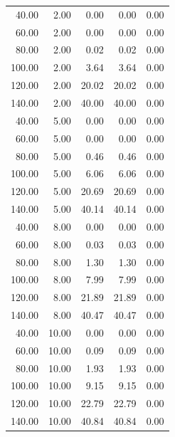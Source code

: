 \begin{longtable}{@{}rrrrr@{}}
40.00  & 2.00  & 0.00 & 0.00 & 0.00 \\
60.00  & 2.00  & 0.00 & 0.00 & 0.00 \\
80.00  & 2.00  & 0.02 & 0.02 & 0.00 \\
100.00 & 2.00  & 3.64 & 3.64 & 0.00 \\
120.00 & 2.00  & 20.02 & 20.02 & 0.00 \\
140.00 & 2.00  & 40.00 & 40.00 & 0.00 \\
40.00  & 5.00  & 0.00 & 0.00 & 0.00 \\
60.00  & 5.00  & 0.00 & 0.00 & 0.00 \\
80.00  & 5.00  & 0.46 & 0.46 & 0.00 \\
100.00 & 5.00  & 6.06 & 6.06 & 0.00 \\
120.00 & 5.00  & 20.69 & 20.69 & 0.00 \\
140.00 & 5.00  & 40.14 & 40.14 & 0.00 \\
40.00  & 8.00  & 0.00 & 0.00 & 0.00 \\
60.00  & 8.00  & 0.03 & 0.03 & 0.00 \\
80.00  & 8.00  & 1.30 & 1.30 & 0.00 \\
100.00 & 8.00  & 7.99 & 7.99 & 0.00 \\
120.00 & 8.00  & 21.89 & 21.89 & 0.00 \\
140.00 & 8.00  & 40.47 & 40.47 & 0.00 \\
40.00  & 10.00 & 0.00 & 0.00 & 0.00 \\
60.00  & 10.00 & 0.09 & 0.09 & 0.00 \\
80.00  & 10.00 & 1.93 & 1.93 & 0.00 \\
100.00 & 10.00 & 9.15 & 9.15 & 0.00 \\
120.00 & 10.00 & 22.79 & 22.79 & 0.00 \\
140.00 & 10.00 & 40.84 & 40.84 & 0.00 \\
\end{longtable}
\endgroup
